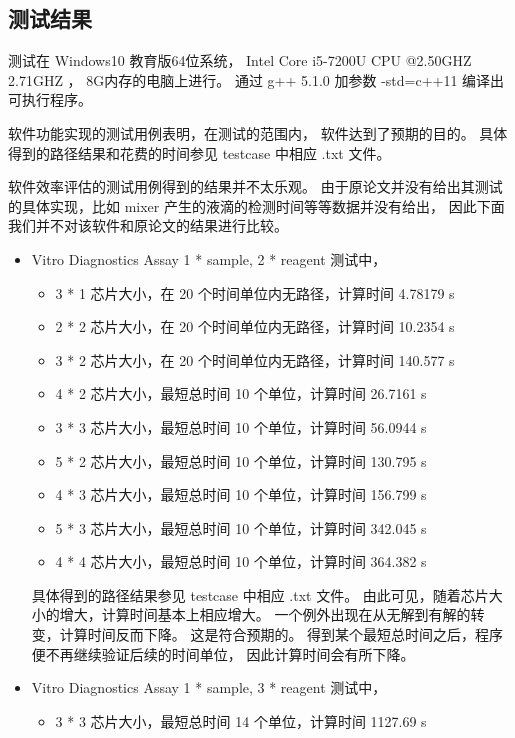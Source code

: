\documentclass[UTF8, a4paper, titlepage]{ctexart}
\begin{document}
\subsection{测试结果}
测试在 Windows10 教育版64位系统， %
Intel Core i5-7200U CPU @2.50GHZ 2.71GHZ ，%
8G内存的电脑上进行。%
通过 g++ 5.1.0 加参数 -std=c++11 编译出可执行程序。%

软件功能实现的测试用例表明，在测试的范围内，%
软件达到了预期的目的。%
具体得到的路径结果和花费的时间参见 testcase 中相应 .txt 文件。%

软件效率评估的测试用例得到的结果并不太乐观。%
由于原论文并没有给出其测试的具体实现，比如 mixer 产生的液滴的检测时间等等数据并没有给出，%
因此下面我们并不对该软件和原论文的结果进行比较。%
\begin{itemize}
	\item Vitro Diagnostics Assay 1 * sample, 2 * reagent 测试中，%
	      \begin{itemize}
		      \item 3 * 1 芯片大小，在 20 个时间单位内无路径，计算时间 4.78179 s
		      \item 2 * 2 芯片大小，在 20 个时间单位内无路径，计算时间 10.2354 s
		      \item 3 * 2 芯片大小，在 20 个时间单位内无路径，计算时间 140.577 s
		      \item 4 * 2 芯片大小，最短总时间 10 个单位，计算时间 26.7161 s
		      \item 3 * 3 芯片大小，最短总时间 10 个单位，计算时间 56.0944 s
		      \item 5 * 2 芯片大小，最短总时间 10 个单位，计算时间 130.795 s
		      \item 4 * 3 芯片大小，最短总时间 10 个单位，计算时间 156.799 s
		      \item 5 * 3 芯片大小，最短总时间 10 个单位，计算时间 342.045 s
		      \item 4 * 4 芯片大小，最短总时间 10 个单位，计算时间 364.382 s
	      \end{itemize}
	      具体得到的路径结果参见 testcase 中相应 .txt 文件。%
	      由此可见，随着芯片大小的增大，计算时间基本上相应增大。%
	      一个例外出现在从无解到有解的转变，计算时间反而下降。%
	      这是符合预期的。%
	      得到某个最短总时间之后，程序便不再继续验证后续的时间单位，%
	      因此计算时间会有所下降。%
	\item Vitro Diagnostics Assay 1 * sample, 3 * reagent 测试中，%
	      \begin{itemize}
		      \item 3 * 3 芯片大小，最短总时间 14 个单位，计算时间 1127.69 s

\end{itemize}
\end{itemize}
\end{document}
